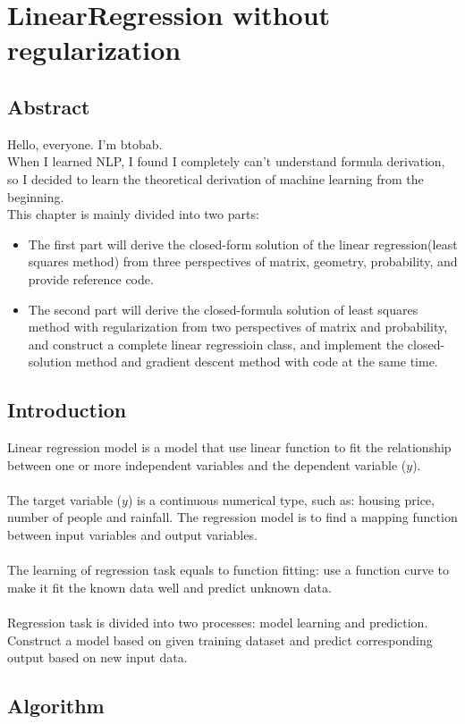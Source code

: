 \documentclass{report}
\begin{document}
\section{LinearRegression without regularization}
\subsection{Abstract}
Hello, everyone. I'm btobab.\\
When I learned NLP, I found I completely can't understand formula derivation, so I decided to learn the theoretical derivation of machine learning from the beginning.\\
This chapter is mainly divided into two parts:
\begin{itemize}
	\item[] The first part will derive the closed-form solution of the linear regression(least squares method) from three perspectives of matrix, geometry, probability, and provide reference code.
	\item[] The second part will derive the closed-formula solution of least squares method with regularization from two perspectives of matrix and probability, and construct a complete linear regressioin class, and implement the closed-solution method and gradient descent method with code at the same time.
\end{itemize}
\subsection{Introduction}
Linear regression model is a model that use linear function to fit the relationship between one or more independent variables and the dependent variable ($y$).\\\\
The target variable ($y$) is a continuous numerical type, such as: housing price, number of people and rainfall. The regression model is to find a mapping function between input variables and output variables.\\\\
The learning of regression task equals to function fitting: use a function curve to make it fit the known data well and predict unknown data.\\\\
Regression task is divided into two processes: model learning and prediction. Construct a model based on given training dataset and predict corresponding output based on new input data.
\subsection{Algorithm}
\end{document}
